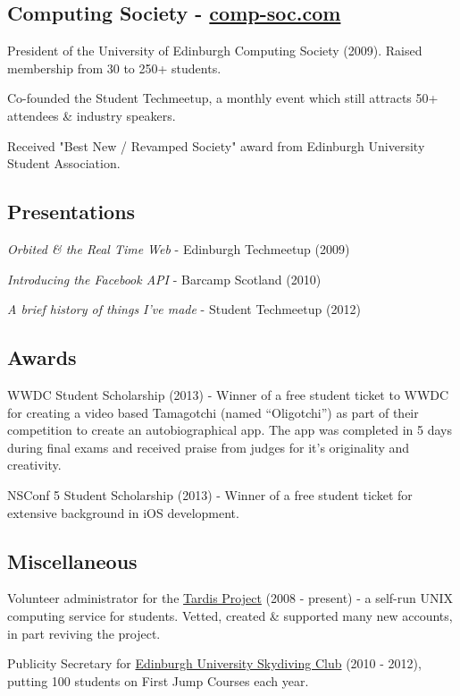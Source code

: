 \documentclass[a4paper]{article}
\renewenvironment{itemize}{
  \begin{list}{}{
    \setlength{\leftmargin}{1.5em}
  }
}{
  \end{list}
}
\begin{document}
\subsection*{Computing Society - \href{http://comp-soc.com}{comp-soc.com}}
\begin{itemize}
\item President of the University of Edinburgh Computing Society (2009). Raised membership from 30 to 250+ students.
\item Co-founded the Student Techmeetup, a monthly event which still attracts 50+ attendees \& industry speakers.
\item Received "Best New / Revamped Society" award from Edinburgh University Student Association.
\end{itemize}

\subsection*{Presentations}
\begin{itemize}
\item \emph{Orbited \& the Real Time Web} - Edinburgh Techmeetup (2009)
\item \emph{Introducing the Facebook API} - Barcamp Scotland (2010)
\item \emph{A brief history of things I've made} - Student Techmeetup (2012)
\end{itemize}

\subsection*{Awards}
\item WWDC Student Scholarship (2013) - Winner of a free student ticket to WWDC for creating a video based Tamagotchi (named ``Oligotchi'') as part of their competition to create an autobiographical app. The app was completed in 5 days during final exams and received praise from judges for it's originality and creativity. 
\item NSConf 5 Student Scholarship (2013) - Winner of a free student ticket for extensive background in iOS development.

\subsection*{Miscellaneous}
\begin{itemize}
\item Volunteer administrator for the \href{http://www.tardis.ed.ac.uk/}{Tardis Project} (2008 - present) - a self-run UNIX computing service for students. Vetted, created \& supported many new accounts, in part reviving the project.
\item Publicity Secretary for \href{http://facebook.com/getjumped/}{Edinburgh University Skydiving Club} (2010 - 2012), putting 100 students on First Jump Courses each year.
\end{itemize}
\end{document}

